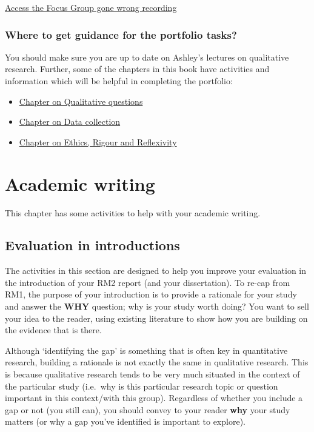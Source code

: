 \documentclass[
  english,
  letterpaper,
  DIV=11,
  numbers=noendperiod]{scrreprt}
\providecommand{\tightlist}{%
  \setlength{\itemsep}{0pt}\setlength{\parskip}{0pt}}
\begin{document}
\href{https://echo360.org.uk/media/f51c8477-94cd-4a0e-88a8-0a133dd8d21e/public}{Access
the Focus Group gone wrong recording}

\subsection{Where to get guidance for the portfolio
tasks?}\label{where-to-get-guidance-for-the-portfolio-tasks}

You should make sure you are up to date on Ashley's lectures on
qualitative research. Further, some of the chapters in this book have
activities and information which will be helpful in completing the
portfolio:

\begin{itemize}
\tightlist
\item
  \hyperref[ch6_qual_questions]{Chapter on Qualitative questions}
\item
  \hyperref[ch7_data_collection]{Chapter on Data collection}
\item
  \hyperref[ch9_ethics]{Chapter on Ethics, Rigour and Reflexivity}
\end{itemize}

\chapter{Academic writing}\label{ch11_writing}

This chapter has some activities to help with your academic writing.

\section{Evaluation in introductions}\label{eval_intro}

The activities in this section are designed to help you improve your
evaluation in the introduction of your RM2 report (and your
dissertation). To re-cap from RM1, the purpose of your introduction is
to provide a rationale for your study and answer the \textbf{WHY}
question; why is your study worth doing? You want to sell your idea to
the reader, using existing literature to show how you are building on
the evidence that is there.

Although `identifying the gap' is something that is often key in
quantitative research, building a rationale is not exactly the same in
qualitative research. This is because qualitative research tends to be
very much situated in the context of the particular study (i.e.~why is
this particular research topic or question important in this
context/with this group). Regardless of whether you include a gap or not
(you still can), you should convey to your reader \textbf{why} your
study matters (or why a gap you've identified is important to explore).
\end{document}
